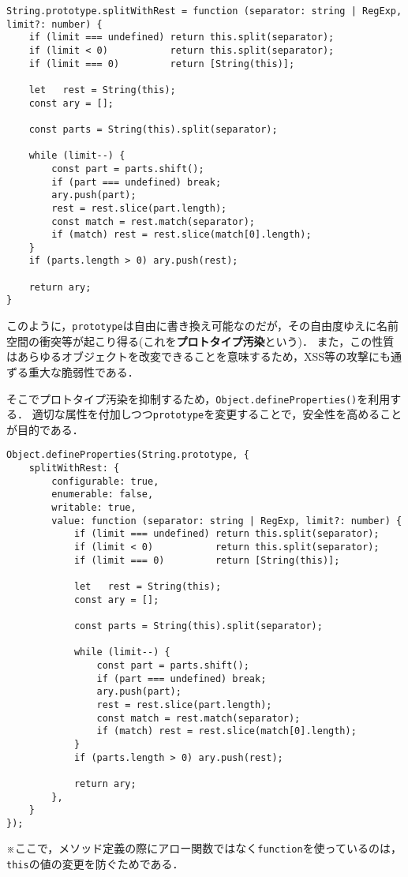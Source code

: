\documentclass[autodetect-engine,dvi=dvipdfmx,ja=standard,
               a4j,11pt]{bxjsarticle}
\begin{document}
\begin{Verbatim}[numbers=none, xleftmargin=8mm, numbersep=6pt, fontsize=\small, baselinestretch=0.8]
String.prototype.splitWithRest = function (separator: string | RegExp, limit?: number) {
    if (limit === undefined) return this.split(separator);
    if (limit < 0)           return this.split(separator);
    if (limit === 0)         return [String(this)];

    let   rest = String(this);
    const ary = [];

    const parts = String(this).split(separator);

    while (limit--) {
        const part = parts.shift();
        if (part === undefined) break;
        ary.push(part);
        rest = rest.slice(part.length);
        const match = rest.match(separator);
        if (match) rest = rest.slice(match[0].length);
    }
    if (parts.length > 0) ary.push(rest);

    return ary;
}
\end{Verbatim}
%
このように，\verb|prototype|は自由に書き換え可能なのだが，その自由度ゆえに名前空間の衝突等が起こり得る(これを{\bf プロトタイプ汚染}という)．
また，この性質はあらゆるオブジェクトを改変できることを意味するため，XSS等の攻撃にも通ずる重大な脆弱性である．

そこでプロトタイプ汚染を抑制するため，\verb|Object.defineProperties()|を利用する．
適切な属性を付加しつつ\verb|prototype|を変更することで，安全性を高めることが目的である．

\begin{Verbatim}[numbers=none, xleftmargin=8mm, numbersep=6pt, fontsize=\small, baselinestretch=0.8]
Object.defineProperties(String.prototype, {
    splitWithRest: {
        configurable: true,
        enumerable: false,
        writable: true,
        value: function (separator: string | RegExp, limit?: number) {
            if (limit === undefined) return this.split(separator);
            if (limit < 0)           return this.split(separator);
            if (limit === 0)         return [String(this)];

            let   rest = String(this);
            const ary = [];

            const parts = String(this).split(separator);

            while (limit--) {
                const part = parts.shift();
                if (part === undefined) break;
                ary.push(part);
                rest = rest.slice(part.length);
                const match = rest.match(separator);
                if (match) rest = rest.slice(match[0].length);
            }
            if (parts.length > 0) ary.push(rest);

            return ary;
        },
    }
});
\end{Verbatim}
%
※ここで，メソッド定義の際にアロー関数ではなく\verb|function|を使っているのは，\verb|this|の値の変更を防ぐためである．
\end{document}
